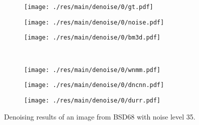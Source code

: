 \documentclass{article} %
\begin{document}
\begin{figure}[ht]
	\centering
	\begin{subfigure}[t]{0.3\textwidth}
		\centering
		\texttt{[image: ./res/main/denoise/0/gt.pdf]}
	\end{subfigure}
	\quad
	\begin{subfigure}[t]{0.3\textwidth}
		\centering
		\texttt{[image: ./res/main/denoise/0/noise.pdf]}
	\end{subfigure}
	\quad
	\begin{subfigure}[t]{0.3\textwidth}
		\centering
		\texttt{[image: ./res/main/denoise/0/bm3d.pdf]}
	\end{subfigure}\\
	\begin{subfigure}[t]{0.3\textwidth}
		\centering
		\texttt{[image: ./res/main/denoise/0/wnmm.pdf]}
	\end{subfigure}
	\quad
	\begin{subfigure}[t]{0.3\textwidth}
		\centering
		\texttt{[image: ./res/main/denoise/0/dncnn.pdf]}
	\end{subfigure}
	\quad
	\begin{subfigure}[t]{0.3\textwidth}
		\centering
		\texttt{[image: ./res/main/denoise/0/durr.pdf]}
	\end{subfigure}
	\caption{Denoising results of an image from BSD68 with
		noise level 35.}
	\label{test1}
\end{figure}
\end{document}
